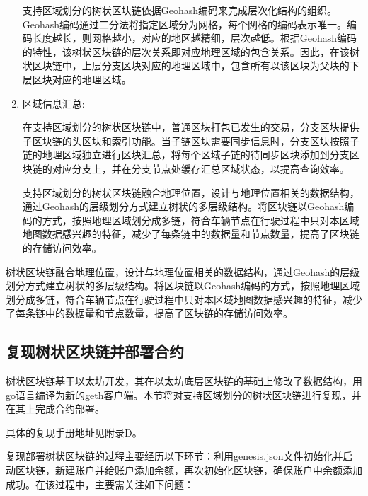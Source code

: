 \begin{enumerate}
    支持区域划分的树状区块链依据Geohash编码来完成层次化结构的组织。Geohash编码通过二分法将指定区域分为网格，每个网格的编码表示唯一。编码长度越长，则网格越小，对应的地区越精细，层次越低。根据Geohash编码的特性，该树状区块链的层次关系即对应地理区域的包含关系。因此，在该树状区块链中，上层分支区块对应的地理区域中，包含所有以该区块为父块的下层区块对应的地理区域。
    \item 区域信息汇总:

    在支持区域划分的树状区块链中，普通区块打包已发生的交易，分支区块提供子区块链的头区块和索引功能。当子链区块需要同步信息时，分支区块按照子链的地理区域独立进行区块汇总，将每个区域子链的待同步区块添加到分支区块链的对应分支上，并在分支节点处缓存汇总区域状态，以提高查询效率。
    
    支持区域划分的树状区块链融合地理位置，设计与地理位置相关的数据结构，通过Geohash的层级划分方式建立树状的多层级结构。将区块链以Geohash编码的方式，按照地理区域划分成多链，符合车辆节点在行驶过程中只对本区域地图数据感兴趣的特征，减少了每条链中的数据量和节点数量，提高了区块链的存储访问效率。
\end{enumerate}

\space 树状区块链融合地理位置，设计与地理位置相关的数据结构，通过Geohash的层级划分方式建立树状的多层级结构。将区块链以Geohash编码的方式，按照地理区域划分成多链，符合车辆节点在行驶过程中只对本区域地图数据感兴趣的特征，减少了每条链中的数据量和节点数量，提高了区块链的存储访问效率。

\subsection{复现树状区块链并部署合约}

树状区块链基于以太坊开发，其在以太坊底层区块链的基础上修改了数据结构，用go语言编译为新的geth客户端。本节将对支持区域划分的树状区块链进行复现，并在其上完成合约部署。

具体的复现手册地址见附录D。

复现部署树状区块链的过程主要经历以下环节：利用genesis.json文件初始化并启动区块链，新建账户并给账户添加余额，再次初始化区块链，确保账户中余额添加成功。在该过程中，主要需关注如下问题：

